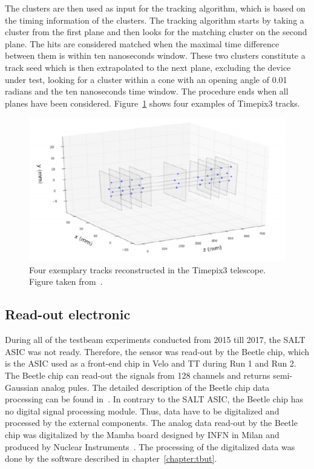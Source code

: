 The clusters are then used as input for the tracking algorithm, which is based on the timing information of the clusters.  The tracking algorithm starts by taking a cluster from the first plane and then looks for the matching cluster on the second plane. The hits are considered matched when the maximal time difference between them is within ten nanoseconds window. These two clusters constitute a track seed which is then extrapolated to the next plane, excluding the device under test, looking for a cluster within a cone with an opening angle of 0.01 radians and the ten nanoseconds time window. The procedure ends when all planes have been considered. Figure~\ref{fig:telescope_tracks} shows four examples of Timepix3 tracks. 



\begin{figure}
\centering
\includegraphics[scale=0.9]{figures/telescope_tracks.png}
\caption{Four exemplary tracks reconstructed in the Timepix3 telescope. Figure taken from~\cite{Sophie}.}
\label{fig:telescope_tracks}
\end{figure}


\subsection{Read-out electronic}
During all of the testbeam experiments conducted from 2015 till 2017, the SALT ASIC was not ready. Therefore, the sensor was read-out by the Beetle chip, which is the ASIC used as a front-end chip in Velo and TT during Run 1 and Run 2. The Beetle chip can read-out the signals from 128 channels and returns semi-Gaussian analog pules. The detailed description of the Beetle chip data processing can be found in~\cite{Beetle}. In contrary to the SALT ASIC, the Beetle chip has no digital signal processing module. Thus, data have to be digitalized and processed by the external components.  
The analog data read-out by the Beetle chip was digitalized by the Mamba board designed by INFN in Milan and produced by Nuclear Instruments~\cite{NuclearInstruments}.   
The processing of the digitalized data was done by the software described in chapter~\ref{chapter:tbut}. 

